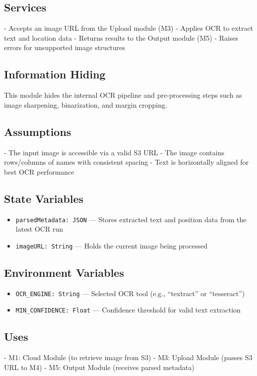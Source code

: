 \documentclass[12pt, titlepage]{article}
\begin{document}
\subsection*{Services}
- Accepts an image URL from the Upload module (M3)  
- Applies OCR to extract text and location data  
- Returns results to the Output module (M5)  
- Raises errors for unsupported image structures

\subsection*{Information Hiding}
This module hides the internal OCR pipeline and pre-processing steps such as image sharpening, binarization, and margin cropping.

\subsection*{Assumptions}
- The input image is accessible via a valid S3 URL  
- The image contains rows/columns of names with consistent spacing  
- Text is horizontally aligned for best OCR performance

\subsection*{State Variables}
\begin{itemize}
  \item \texttt{parsedMetadata: JSON} — Stores extracted text and position data from the latest OCR run
  \item \texttt{imageURL: String} — Holds the current image being processed
\end{itemize}

\subsection*{Environment Variables}
\begin{itemize}
  \item \texttt{OCR\_ENGINE: String} — Selected OCR tool (e.g., “textract” or “tesseract”)  
  \item \texttt{MIN\_CONFIDENCE: Float} — Confidence threshold for valid text extraction
\end{itemize}

\subsection*{Uses}
- M1: Cloud Module (to retrieve image from S3)
- M3: Upload Module (passes S3 URL to M4)
- M5: Output Module (receives parsed metadata)
\end{document}
